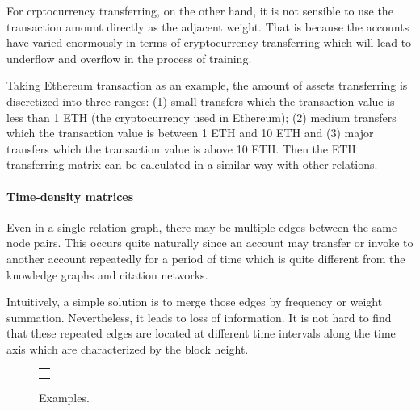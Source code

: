For crptocurrency transferring, on the other hand, it is not sensible to use the transaction amount directly as the adjacent weight. That is because the accounts have varied enormously in terms of cryptocurrency transferring which will lead to underflow and overflow in the process of training.

 Taking Ethereum transaction as an example, the amount of assets transferring is discretized into three ranges: (1) small transfers which the transaction value is less than 1 ETH (the cryptocurrency used in Ethereum); (2) medium transfers which the transaction value is between 1 ETH and 10 ETH and (3) major transfers which the transaction value is above 10 ETH. Then the ETH transferring matrix can be calculated in a similar way with other relations.



\paragraph{Time-density matrices}
Even in a single relation graph, there may be multiple edges between the same node pairs. This occurs quite naturally since an account may transfer or invoke to another account repeatedly for a period of time which is quite different from the knowledge graphs and citation networks.

Intuitively, a simple solution is to merge those edges by frequency or weight summation. Nevertheless, it leads to loss of information. It is not hard to find that these repeated edges are located at different time intervals along the time axis which are characterized by the block height.

\begin{figure}[htbp]
\centering
\begin{tabular}{c}
	\subfigure[Time variance histogram of whole nodes.]{
		\label{fig:high_order}
    
	}\\
	\subfigure[Time variance histogram of hack\&phish nodes.]{
		\label{fig:asymmetric}
    
	}
\end{tabular}
\caption{Examples.}
\label{fig:time_std}
\end{figure}

